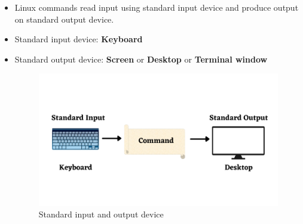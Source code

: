 \setlength{\columnsep}{3pt}
\begin{flushleft}
	\bigskip
	\begin{itemize}
		\item Linux commands read input using standard input device and produce output on standard output device.
		\item Standard input device: \textbf{Keyboard}
		\item Standard output device: \textbf{Screen} or \textbf{Desktop} or \textbf{Terminal window}
		\begin{figure}[h!]
			\centering
			\includegraphics[scale=.5]{content/chapter7/images/std_in_out.png}
			\caption{Standard input and output device}
			\label{fig:path}
		\end{figure}
	\end{itemize}
	
\end{flushleft}

\newpage

